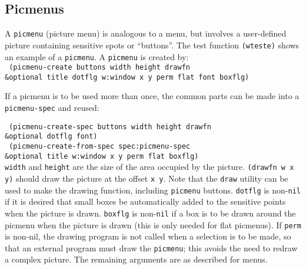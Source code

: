\subsection{Picmenus}

A {\tt picmenu} (picture menu) is analogous to a menu, but involves a
user-defined picture containing sensitive spots or ``buttons''.
The test function {\tt (wteste)} shows an example of a {\tt picmenu}.
A {\tt picmenu} is created by: \\

\vspace{-0.1in}
{\tt \hspace*{0.5in} (picmenu-create buttons width height drawfn \\
\hspace*{1.5in} \&optional title dotflg w:window x y perm flat font boxflg)} \\

\vspace{-0.1in}

If a picmenu is to be used more than once, the common parts can be made
into a {\tt picmenu-spec} and reused:

\vspace{-0.1in}
{\tt \hspace*{0.5in} (picmenu-create-spec buttons width height drawfn \\
\hspace*{1.5in} \&optional dotflg font)} \\

\vspace{-0.1in}
{\tt \hspace*{0.5in} (picmenu-create-from-spec spec:picmenu-spec \\
\hspace*{1.5in} \&optional title w:window x y perm flat boxflg)} \\

\vspace{-0.1in}
{\tt width} and {\tt height} are the size of the area occupied by the
picture.  {\tt (drawfn w x y)} should draw the picture at the offset
{\tt x y}.  Note that the {\tt draw} utility can be used to
make the drawing function, including {\tt picmenu} buttons.
{\tt dotflg} is non-{\tt nil} if it is desired that small boxes be
automatically added to the sensitive points when the picture is drawn.
{\tt boxflg} is non-{\tt nil} if a box is to be drawn around the picmenu
when the picture is drawn (this is only needed for flat
picmenus).  If {\tt perm} is non-nil, the drawing program is not called when
a selection is to be made, so that an external program must draw the
{\tt picmenu}; this avoids the need to redraw a complex picture.
The remaining arguments are as described for menus.


